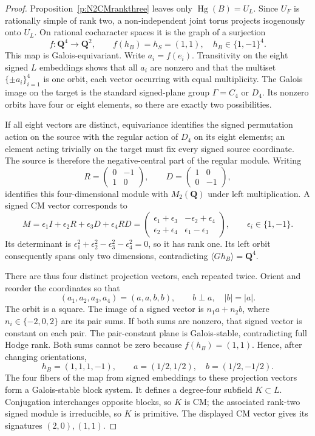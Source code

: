 \documentclass[11pt,reqno]{article}
\theoremstyle{emphasizedplain}
\theoremstyle{emphasizeddefinition}
\theoremstyle{emphasizeddefinition}
\DeclareMathOperator{\Hg}{Hg}
\newcommand{\Q}{\mathbf Q}
\begin{document}
\begin{proof}
Proposition~\ref{p:N2CMrankthree} leaves only $\Hg(B)=U_L$.
Since $U_F$ is rationally simple of rank two, a non-independent
joint torus projects isogenously onto $U_L$. On rational
cocharacter spaces it is the graph of a surjection
\[
 f:\Q^4\longrightarrow\Q^2,\qquad f(h_B)=h_S=(1,1),
 \quad h_B\in\{1,-1\}^4.
\]
This map is Galois-equivariant. Write $a_i=f(e_i)$.
Transitivity on the eight signed $L$ embeddings shows that all
$a_i$ are nonzero and that the multiset $\{\pm a_i\}_{i=1}^4$
is one orbit, each vector occurring with equal multiplicity.
The Galois image on the target is the standard signed-plane
group $\Gamma=C_4$ or $D_4$. Its nonzero orbits have four or
eight elements, so there are exactly two possibilities.

If all eight vectors are distinct, equivariance identifies the
signed permutation action on the source with the regular action
of $D_4$ on its eight elements; an element acting trivially on
the target must fix every signed source coordinate. The source
is therefore the negative-central part of the regular module.
Writing
\[
 R=\begin{pmatrix}0&-1\\1&0\end{pmatrix},\qquad
 D=\begin{pmatrix}1&0\\0&-1\end{pmatrix},
\]
identifies this four-dimensional module with $M_2(\Q)$ under
left multiplication. A signed CM vector corresponds to
\[
 M=\epsilon_1 I+\epsilon_2 R+\epsilon_3 D+\epsilon_4 RD
 =\begin{pmatrix}
 \epsilon_1+\epsilon_3&-\epsilon_2+\epsilon_4\\
 \epsilon_2+\epsilon_4&\epsilon_1-\epsilon_3
 \end{pmatrix},\qquad \epsilon_i\in\{1,-1\}.
\]
Its determinant is
$\epsilon_1^2+\epsilon_2^2-\epsilon_3^2-\epsilon_4^2=0$,
so it has rank one. Its left orbit consequently spans only two
dimensions, contradicting $\langle Gh_B\rangle=\Q^4$.

There are thus four distinct projection vectors, each repeated
twice. Orient and reorder the coordinates so that
\[
 (a_1,a_2,a_3,a_4)=(a,a,b,b),\qquad b\perp a,\quad |b|=|a|.
\]
The orbit is a square. The image of a signed vector is $n_1a+n_2b$,
where $n_i\in\{-2,0,2\}$ are its pair sums. If both sums are
nonzero, that signed vector is constant on each pair. The
pair-constant plane is Galois-stable, contradicting full Hodge
rank. Both sums cannot be zero because $f(h_B)=(1,1)$.
Hence, after changing orientations,
\[
 h_B=(1,1,1,-1),\qquad
 a=(1/2,1/2),\quad b=(1/2,-1/2).
\]
The four fibers of the map from signed embeddings to these
projection vectors form a Galois-stable block system. It defines
a degree-four subfield $K\subset L$. Conjugation interchanges
opposite blocks, so $K$ is CM; the associated rank-two signed
module is irreducible, so $K$ is primitive. The displayed CM
vector gives its signatures $(2,0),(1,1)$.


\end{proof}
\end{document}
